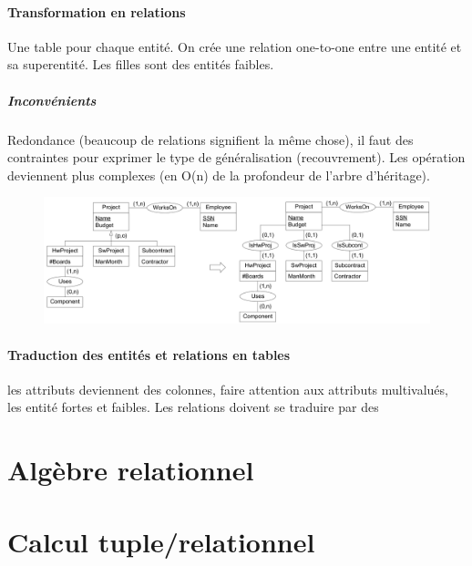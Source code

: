 \documentclass[a4paper]{article}
\begin{document}
\paragraph{Transformation en relations}
Une table pour chaque entité. On crée une relation one-to-one entre une entité
et sa superentité. Les filles sont des entités faibles.
\subparagraph{Inconvénients}
Redondance (beaucoup de relations signifient la même chose), il faut des contraintes
pour exprimer le type de généralisation (recouvrement). Les opération deviennent plus
complexes (en O(n) de la profondeur de l'arbre d'héritage).
\begin{figure}[H]
    \center
    \includegraphics[width=.9\textwidth]{fig/er2rm-3.png}
\end{figure}

\paragraph{Traduction des entités et relations en tables} les attributs deviennent
des colonnes, faire attention aux attributs multivalués, les entité fortes et faibles.
Les relations doivent se traduire par des 



\section{Algèbre relationnel}


\section{Calcul tuple/relationnel}
\end{document}
